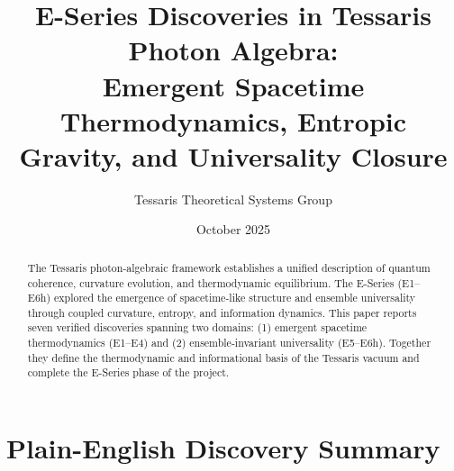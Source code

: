 \documentclass[12pt]{article}
\begin{document}
\title{\textbf{E-Series Discoveries in Tessaris Photon Algebra:\\
Emergent Spacetime Thermodynamics, Entropic Gravity, and Universality Closure}}
\author{Tessaris Theoretical Systems Group}
\date{October 2025}
\maketitle

\begin{abstract}
The Tessaris photon-algebraic framework establishes a unified description of quantum coherence, curvature evolution, and thermodynamic equilibrium.
The E-Series (E1–E6h) explored the emergence of spacetime-like structure and ensemble universality through coupled curvature, entropy, and information dynamics.
This paper reports seven verified discoveries spanning two domains: (1) emergent spacetime thermodynamics (E1–E4) and (2) ensemble-invariant universality (E5–E6h).
Together they define the thermodynamic and informational basis of the Tessaris vacuum and complete the E-Series phase of the project.
\end{abstract}

\section*{Plain-English Discovery Summary}
\end{document}
